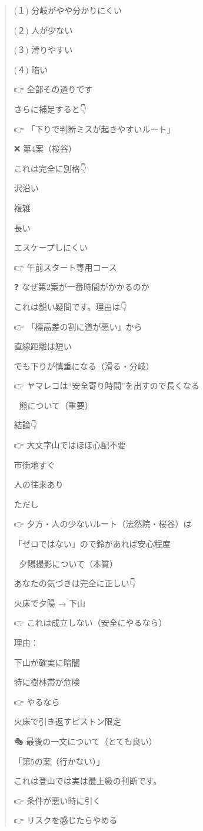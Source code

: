 \begin{quote}
(１) 分岐がやや分かりにくい

(２) 人が少ない

(３) 滑りやすい

(４) 暗い

👉 全部その通りです

さらに補足すると👇

👉 「下りで判断ミスが起きやすいルート」

❌ 第4案（桜谷）

これは完全に別格👇

沢沿い

複雑

長い

エスケープしにくい

👉 午前スタート専用コース

❓ なぜ第2案が一番時間がかかるのか

これは鋭い疑問です。理由は👇

👉 「標高差の割に道が悪い」から

直線距離は短い

でも下りが慎重になる（滑る・分岐）

👉 ヤマレコは“安全寄り時間”を出すので長くなる

🧸 熊について（重要）

結論👇

👉 大文字山ではほぼ心配不要

市街地すぐ

人の往来あり

ただし

👉 夕方・人の少ないルート（法然院・桜谷）は

「ゼロではない」ので鈴があれば安心程度

🌅 夕陽撮影について（本質）

あなたの気づきは完全に正しい👇

火床で夕陽 → 下山

👉 これは成立しない（安全にやるなら）

理由：

下山が確実に暗闇

特に樹林帯が危険

👉 やるなら

火床で引き返すピストン限定

🎭 最後の一文について（とても良い）

「第5の案（行かない）」

これは登山では実は最上級の判断です。

👉 条件が悪い時に引く

👉 リスクを感じたらやめる


\end{quote}
